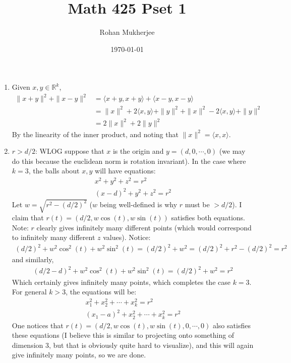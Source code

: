 \documentclass[12pt]{article}
\title{Math 425 Pset 1}
\date{\today}
\author{Rohan Mukherjee}
\def\mbb#1{\mathbb{#1}}
\def \R{\mbb{R}}
\newcommand{\mg}[1]{\| #1 \|}
\theoremstyle{definition}
\theoremstyle{remark}
\renewcommand{\ip}[2]{\langle #1, #2 \rangle}
\begin{document}
	\maketitle
	\begin{enumerate}[leftmargin=\labelsep]
		\item Given $x, y \in \R^k$, 
		\begin{align*}
			\mg{x+y}^2 + \mg{x-y}^2 &= \ip{x+y}{x+y} + \ip{x-y}{x-y} \\
			&= \mg{x}^2 + 2\ip{x}{y} + \mg{y}^2 + \mg{x}^2 - 2\ip{x}{y} + \mg{y}^2 \\
			&= 2\mg{x}^2 + 2\mg{y}^2
		\end{align*}
		By the linearity of the inner product, and noting that $\mg{x}^2 = \ip{x}{x}$.
		
		\item $r > d/2$: WLOG suppose that $x$ is the origin and $y = (d, 0, \cdots, 0)$ (we may do this because the euclidean norm is rotation invariant). In the case where $k = 3$, the balls about $x, y$ will have equations:
		\begin{align*}
			x^2 + y^2 + z^2 = r^2 \\
			(x-d)^2 + y^2 + z^2 = r^2
		\end{align*}
		Let $w = \sqrt{r^2 - (d/2)^2}$ ($w$ being well-defined is why $r$ must be $> d/2$).
		I claim that $r(t) = (d/2, w\cos(t), w\sin(t))$ satisfies both equations. Note: $r$ clearly gives infinitely many different points (which would correspond to infinitely many different $z$ values). Notice:
		\begin{align*}
			(d/2)^2+w^2\cos^2(t)+w^2\sin^2(t) = (d/2)^2 + w^2 = (d/2)^2 + r^2 - (d/2)^2 = r^2
		\end{align*}
		and similarly,
		\begin{align*}
			(d/2-d)^2 + w^2\cos^2(t) + w^2\sin^2(t) = (d/2)^2 + w^2 = r^2
		\end{align*}
		Which certainly gives infinitely many points, which completes the case $k = 3$. For general $k > 3$, the equations will be:
		\begin{align*}
			x_1^2 + x_2^2 + \cdots + x_k^2 = r^2 \\
			(x_1-a)^2 + x_2^2 + \cdots + x_k^2 = r^2
		\end{align*}
		One notices that $r(t) = (d/2, w\cos(t), w\sin(t), 0, \cdots, 0)$ also satisfies these equations (I believe this is similar to projecting onto something of dimension 3, but that is obviously quite hard to visualize), and this will again give infinitely many points, so we are done.
		

\end{enumerate}
\end{document}
